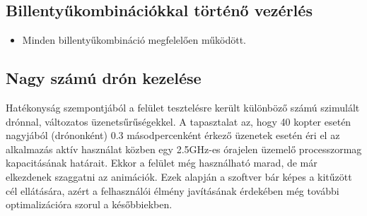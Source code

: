 \subsection{Billentyűkombinációkkal történő vezérlés}

\begin{itemize}

  \item Minden billentyűkombináció megfelelően működött.

\end{itemize}


\subsection{Nagy számú drón kezelése}

Hatékonyság szempontjából a felület tesztelésre került különböző számú szimulált
drónnal, változatos üzenetsűrűségekkel. A tapasztalat az, hogy 40 kopter esetén
nagyjából (drónonként) 0.3 másodpercenként érkező üzenetek esetén éri el az
alkalmazás aktív használat közben egy 2.5GHz-es órajelen üzemelő processzormag
kapacitásának határait. Ekkor a felület még használható marad, de már elkezdenek
szaggatni az animációk. Ezek alapján a szoftver bár képes a kitűzött cél
ellátására, azért a felhasználói élmény javításának érdekében még további
optimalizációra szorul a későbbiekben.
